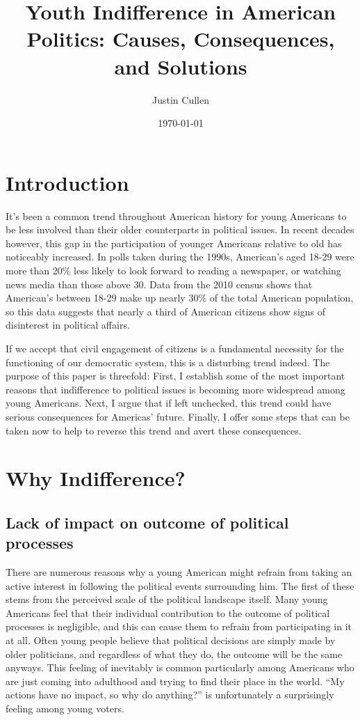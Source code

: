 \documentclass[12pt,letterpaper]{article}
\begin{document}
\title{Youth Indifference in American Politics: Causes, Consequences,
and Solutions}
\author{Justin Cullen}
\date{\today}
\maketitle

\section{Introduction} %
\label{sec:Introduction}
It's been a common trend throughout American history for young
Americans to be less involved than their older counterparts in
political issues.  In recent decades however, this gap in the
participation of younger Americans relative to old has noticeably
increased. In polls taken during the 1990s, American's aged 18-29 were
more than 20\% less likely to look forward to reading a newspaper, or
watching news media than those above 30. Data from the 2010 census
shows that American's between 18-29 make up nearly 30\% of the total
American population, so this data suggests that nearly a third of
American citizens show signs of disinterest in political affairs.  

If we accept that civil engagement of citizens is a fundamental
necessity for the functioning of our democratic system, this is a
disturbing trend indeed.  The purpose of this paper is threefold:
First, I establish some of the most important reasons that
indifference to political issues is becoming more widespread among
young Americans.  Next, I argue that if left unchecked, this trend
could have serious consequences for Americas' future.  Finally, I
offer some steps that can be taken now to help to reverse this trend
and avert these consequences.

\section{Why Indifference?} %
\label{sec:Why Indifference?}

\subsection{Lack of impact on outcome of political processes} There
are numerous reasons why a young American might refrain from taking an
active interest in following the political events surrounding him.
The first of these stems from the perceived scale of the political
landscape itself.  Many young Americans feel that their individual
contribution to the outcome of political processes is negligible, and
this can cause them to refrain from participating in it at all.  Often
young people believe that political decisions are simply made by older
politicians, and regardless of what they do, the outcome will be the
same anyways.  This feeling of inevitably is common particularly among
Americans who are just coming into adulthood and trying to find their
place in the world. ``My actions have no impact, so why do anything?''
is unfortunately a surprisingly feeling among young voters.
\end{document}
